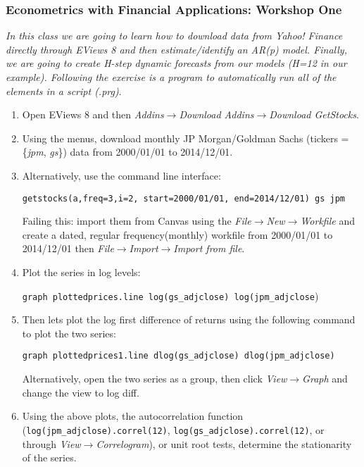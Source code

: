 \documentclass[a4paper,11pt]{article}
\begin{document}
\small
\subsubsection*{Econometrics with Financial Applications: Workshop One}
\textit{In this class we are going to learn how to download data from Yahoo! Finance directly through EViews 8 and then estimate/identify an AR(p) model. Finally, we are going to create \emph{H}-step dynamic forecasts from our models (H=12 in our example). Following the exercise is a program to automatically run all of the elements in a script (.prg)}.
\begin{enumerate}
\item Open EViews 8 and then \emph{Addins}$\rightarrow$\emph{Download Addins}$\rightarrow$\emph{Download GetStocks}.
\item Using the menus, download monthly JP Morgan/Goldman Sachs (tickers = \{\emph{jpm}, \emph{gs}\}) data from 2000/01/01 to 2014/12/01.
\item Alternatively, use the command line interface:
\begin{center}
\footnotesize
\texttt{getstocks(a,freq=3,i=2, start=2000/01/01, end=2014/12/01) gs jpm}\\
\end{center}
Failing this: import them from Canvas using the \emph{File}$\rightarrow$\emph{New}$\rightarrow$\emph{Workfile} and create a dated, regular frequency(monthly) workfile from 2000/01/01 to 2014/12/01 then \emph{File}$\rightarrow$\emph{Import}$\rightarrow$\emph{Import from file}.
\item Plot the series in log levels:
\footnotesize
\begin{center}
\texttt{graph plottedprices.line log(gs\_adjclose) log(jpm\_adjclose})
\end{center}
\item Then lets plot the log first difference of returns using the following command to plot the two series:
\begin{center}
\footnotesize
\texttt{graph plottedprices1.line dlog(gs\_adjclose) dlog(jpm\_adjclose)}
\end{center}
Alternatively, open the two series as a group, then click \emph{View}$\rightarrow$\emph{Graph} and change the view to log diff.
\item Using the above plots, the autocorrelation function (\texttt{log(jpm\_adjclose).correl(12)}, \texttt{log(gs\_adjclose).correl(12)}, or through \emph{View}$\rightarrow$\emph{Correlogram}), or unit root tests, determine the stationarity of the series.

\end{enumerate}
\end{document}
